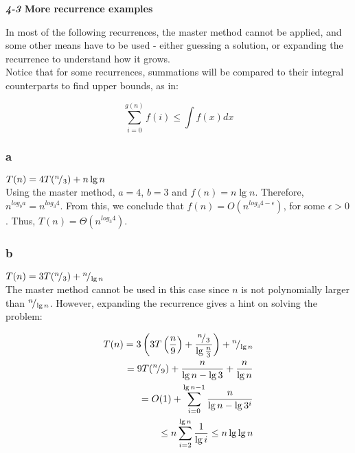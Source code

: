 \documentclass[8pt,a4paper]{article}
\begin{document}
\begin{framed}
\textbf{\textit{4-3} More recurrence examples}
\end{framed}

  In most of the following recurrences, the master method cannot be applied, and some
other means have to be used - either guessing a solution, or expanding the recurrence
to understand how it grows. \\

  Notice that for some recurrences, summations will be compared to their integral
counterparts to find upper bounds, as in:

\begin{equation*}
  \sum\limits_{i = 0}^{g(n)} f(i) \leq \int f(x)dx
\end{equation*}

\subsubsection*{a}

$T(n) = 4T({}^{n}\!/_{3}) + n \lg n$ \\

Using the master method, $a = 4$, $b = 3$ and $f(n) = n \lg n$. Therefore, $n^{log_{b} a} =
n^{log_{3} 4}$. From this, we conclude that $f(n) = O(n^{log_{3} 4 - \epsilon})$, for some
$\epsilon > 0$. Thus, $T(n) = \Theta(n^{log_{3} 4})$.

\subsubsection*{b}

$T(n) = 3T({}^{n}\!/_{3}) + {}^{n}\!/_{\lg n}$ \\

The master method cannot be used in this case since $n$ is not polynomially larger than
${}^{n}\!/_{\lg n}$. However, expanding the recurrence gives a hint on solving
the problem:

\begin{equation*}
  \begin{split}
    T(n) = 3\left(3T\left(\frac{n}{9}\right) + \frac{{}^{n}\!/_{3}}{\lg \frac{n}{3}}\right) + {}^{n}\!/_{\lg n} \\
    = 9T({}^{n}\!/_{9}) + \frac{n}{\lg n - \lg 3} + \frac{n}{\lg n} \\
    = O(1) + \sum\limits_{i = 0}^{\lg n - 1} \frac{n}{\lg n - \lg 3^{i}} \\
    \leq n \sum\limits_{i = 2}^{\lg n} \frac{1}{\lg i} \leq n \lg \lg n
  \end{split}
\end{equation*}
\end{document}
